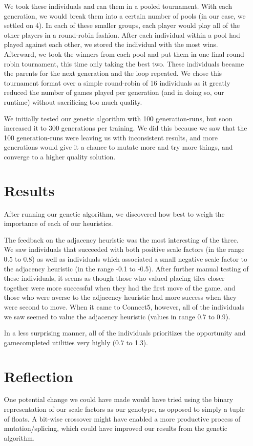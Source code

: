 \documentclass{article}
\begin{document}
We took these individuals and ran them in a pooled tournament. With each generation, we would break them into a certain number of pools (in our case, we settled on 4). In each of these smaller groups, each player would play all of the other players in a round-robin fashion. After each individual within a pool had played against each other, we stored the individual with the most wins. Afterward, we took the winners from each pool and put them in one final round-robin tournament, this time only taking the best two. These individuals became the parents for the next generation and the loop repeated. We chose this tournament format over a simple round-robin of 16 individuals as it greatly reduced the number of games played per generation (and in doing so, our runtime) without sacrificing too much quality. 

We initially tested our genetic algorithm with 100 generation-runs, but soon increased it to 300 generations per training. We did this because we saw that the 100 generation-runs were leaving us with inconsistent results, and more generations would give it a chance to mutate more and try more things, and converge to a higher quality solution. 

\section{Results}
After running our genetic algorithm, we discovered how best to weigh the importance of each of our heuristics.

The feedback on the adjacency heuristic was the most interesting of the three. We saw individuals that succeeded with both positive scale factors (in the range 0.5 to 0.8) as well as individuals which associated a small negative scale factor to the adjacency heuristic (in the range -0.1 to -0.5). After further manual testing of these individuals, it seems as though those who valued placing tiles closer together were more successful when they had the first move of the game, and those who were averse to the adjacency heuristic had more success when they were second to move.  
When it came to Connect5, however, all of the individuals we saw seemed to value the adjacency heuristic (values in range 0.7 to 0.9).

In a less surprising manner, all of the individuals prioritizes the opportunity and game\textunderscore completed utilities very highly (0.7 to 1.3).

\section{Reflection}
One potential change we could have made would have tried using the binary representation of our scale factors as our genotype, as opposed to simply a tuple of floats. A bit-wise crossover might have enabled a more productive process of mutation/splicing, which could have improved our results from the genetic algorithm. 
\end{document}
